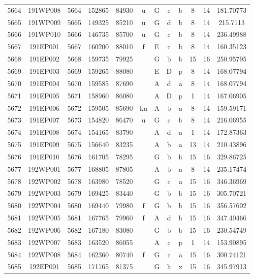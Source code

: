 \begin{tabular}{|*{12}{c|}}
5664 & 191WP008 & 5664 & 152865 & 84930 & u & G & c & b & 8 & 14 & 181.70773 \\ 
5665 & 191WP009 & 5665 & 149325 & 85210 & u & G & d & b & 8 & 14 & 215.7113 \\ 
5666 & 191WP010 & 5666 & 146735 & 85700 & u & G & c & b & 8 & 14 & 236.49988 \\ 
5667 & 191EP001 & 5667 & 160200 & 88010 & f & E & c & b & 8 & 14 & 160.35123 \\ 
5668 & 191EP002 & 5668 & 159735 & 79925 &  & G & b & b & 15 & 16 & 250.95795 \\ 
5669 & 191EP003 & 5669 & 159265 & 88080 &  & E & D & p & 8 & 14 & 168.07794 \\ 
5670 & 191EP004 & 5670 & 159585 & 87690 &  & A & d & a & 8 & 14 & 168.07794 \\ 
5671 & 191EP005 & 5671 & 158960 & 86080 &  & A & D & p & 1 & 14 & 167.06905 \\ 
5672 & 191EP006 & 5672 & 159505 & 85690 & ku & A & b & a & 8 & 14 & 159.59171 \\ 
5673 & 191EP007 & 5673 & 154820 & 86470 & u & G & c & b & 8 & 14 & 216.06955 \\ 
5674 & 191EP008 & 5674 & 154165 & 83790 &  & A & d & a & 1 & 14 & 172.87363 \\ 
5675 & 191EP009 & 5675 & 156640 & 83235 &  & A & b & a & 13 & 14 & 210.43896 \\ 
5676 & 191EP010 & 5676 & 161705 & 78295 &  & G & b & b & 15 & 16 & 329.86725 \\ 
5677 & 192WP001 & 5677 & 168805 & 87805 &  & A & b & a & 8 & 14 & 235.17474 \\ 
5678 & 192WP002 & 5678 & 163980 & 78520 &  & G & c & a & 15 & 16 & 346.36969 \\ 
5679 & 192WP003 & 5679 & 169425 & 83440 &  & G & b & b & 15 & 16 & 305.70721 \\ 
5680 & 192WP004 & 5680 & 169440 & 79980 & f & G & b & b & 15 & 16 & 356.57602 \\ 
5681 & 192WP005 & 5681 & 167765 & 79960 & f & A & d & b & 15 & 16 & 347.40466 \\ 
5682 & 192WP006 & 5682 & 167180 & 83080 &  & G & b & b & 15 & 16 & 230.54749 \\ 
5683 & 192WP007 & 5683 & 163520 & 86055 &  & A & c & p & 1 & 14 & 153.90895 \\ 
5684 & 192WP008 & 5684 & 162360 & 80740 & f & G & c & a & 15 & 16 & 300.74121 \\ 
5685 & 192EP001 & 5685 & 171765 & 81375 &  & G & h & x & 15 & 16 & 345.97913 \\ 

\end{tabular}
